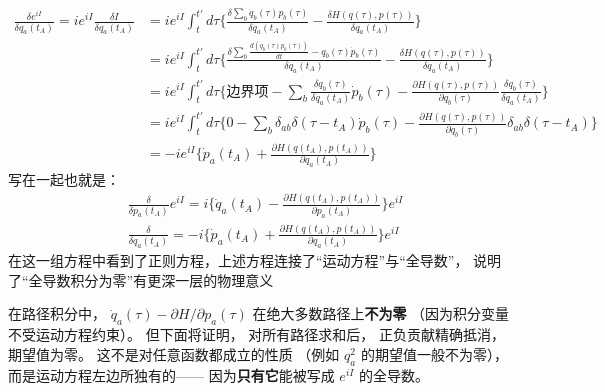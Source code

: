 \[\begin{aligned}
  \frac{\delta e^{iI}}{\delta q_a(t_A)}=
  ie^{iI}\frac{\delta I}{\delta q_a(t_A)}&=ie^{iI}\int_{t}^{t'}d\tau \Biggl\{ \frac{\delta \sum_{b}\dot{q}_b(\tau) p_{b}(\tau)}{\delta q_a(t_A)}-\frac{\delta H(q(\tau),p(\tau))}{\delta q_a(t_A)}\Biggr\}
  \\
  \;&=ie^{iI}\int_{t}^{t'}d\tau \Biggl\{ \frac{\delta \sum_{b}\frac{d(q_b(\tau)p_b(\tau))}{dt}-q_b(\tau)\dot{p}_b(\tau)}{\delta q_a(t_A)}-\frac{\delta H(q(\tau),p(\tau))}{\delta q_a(t_A)}\Biggr\}
  \\
  \;&=ie^{iI}\int_{t}^{t'}d\tau \Biggl\{ \text{边界项}-\sum_{b}\frac{\delta q_{b}(\tau) }{\delta q_a(t_A)}\dot{p}_b(\tau)-\frac{\partial H(q(\tau),p(\tau))}{\partial q_b(\tau)}\frac{\delta q_b(\tau)}{\delta q_a(t_A)}\Biggr\}
  \\
  \;&=ie^{iI}\int_{t}^{t'}d\tau \Biggl\{0- \sum_{b}\delta_{ab}\delta(\tau-t_A)\dot{p}_b(\tau)-\frac{\partial H(q(\tau),p(\tau))}{\partial q_b(\tau)}\delta_{ab}\delta(\tau-t_A)\Biggr\}
  \\
  \;&=-ie^{iI} \Biggl\{ \dot{p}_a(t_A)+\frac{\partial H(q(t_A),p(t_A))}{\partial q_a(t_A)}\Biggr\}
\end{aligned}\]
写在一起也就是：
\begin{subequations}\label{eq:can_eq}
  \begin{align}
    & \frac{\delta }{\delta p_a(t_A)}e^{iI}=i\Biggl\{ \dot{q}_a(t_A)-\frac{\partial H(q(t_A),p(t_A))}{\partial p_a(t_A)}\Biggr\}e^{iI}
    \\
    &\frac{\delta }{\delta q_a(t_A)}=-i \Biggl\{ \dot{p}_a(t_A)+\frac{\partial H(q(t_A),p(t_A))}{\partial q_a(t_A)}\Biggr\}e^{iI}
  \end{align}
\end{subequations}
\color{blue}%
在这一组方程中看到了正则方程，上述方程连接了``运动方程''与``全导数''，
说明了``全导数积分为零''有更深一层的物理意义\normalcolor



\medskip\noindent
\color{blue}%
在路径积分中，
$\dot{q}_a(\tau)-\partial H/\partial p_a(\tau)$
在绝大多数路径上\textbf{不为零}
（因为积分变量不受运动方程约束）。
但下面将证明，
对所有路径求和后，
正负贡献精确抵消，期望值为零。
这不是对任意函数都成立的性质
（例如 $q_a^2$ 的期望值一般不为零），
而是运动方程左边所独有的——
因为\textbf{只有它}能被写成 $e^{iI}$ 的全导数。\normalcolor


